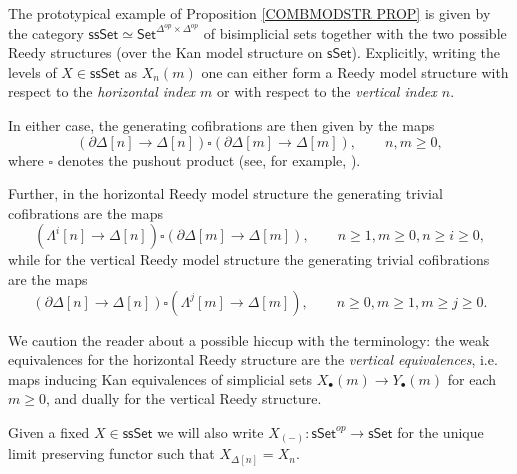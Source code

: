 \documentclass[a4paper,10pt
,draft
]{article}%
\begin{document}
The prototypical example of Proposition \ref{COMBMODSTR PROP} is given by the category 
$\mathsf{ssSet} \simeq \mathsf{Set}^{\Delta^{op} \times \Delta^{op}}$
of bisimplicial sets together with the two possible Reedy structures (over the Kan model structure on $\mathsf{sSet}$).
Explicitly, writing the levels of 
$X \in \mathsf{ssSet}$ as $X_n(m)$
one can either form a Reedy model structure with respect to the 
\textit{horizontal index $m$}
or with respect to the 
\textit{vertical index $n$}.

In either case, the generating cofibrations are then given by the maps
\[
	\left( \partial \Delta[n] \to \Delta[n] \right)
\square
	\left( \partial \Delta[m] \to \Delta[m] \right),
	\qquad n,m\geq 0,
\]
where $\square$ denotes the pushout product (see, for example, \cite[11.1.7]{Ri14}).

Further, in the horizontal Reedy model structure the generating trivial cofibrations are the maps
\begin{equation}\label{GTRCOHOR EQ}
	\left( \Lambda^i[n] \to \Delta[n] \right)
\square
	\left( \partial \Delta[m] \to \Delta[m] \right),
\qquad n \geq 1, m\geq 0, n \geq i \geq 0,
\end{equation}
while for the vertical Reedy model structure the generating trivial cofibrations are the maps
\begin{equation}\label{GTRCOVER EQ}
	\left( \partial \Delta[n] \to \Delta[n] \right)
\square
	\left( \Lambda^j[m] \to \Delta[m] \right),
\qquad n\geq 0, m\geq 1,m\geq j \geq 0.
\end{equation}

We caution the reader about a possible hiccup with the terminology: 
the weak equivalences for the horizontal Reedy structure are the 
\textit{vertical equivalences},
i.e. maps inducing Kan equivalences of simplicial sets
$X_{\bullet}(m) \to Y_{\bullet}(m)$
for each $m \geq 0$, and dually for the vertical Reedy structure.

\begin{notation}\label{UNIQUELIM NOT}
	Given a fixed $X \in \mathsf{ssSet}$ we will also write
	$X_{(-)} \colon \mathsf{sSet}^{op} \to \mathsf{sSet}$
	for the unique limit preserving functor such that
	$X_{\Delta[n]} = X_n$.
\end{notation}

\end{document}
